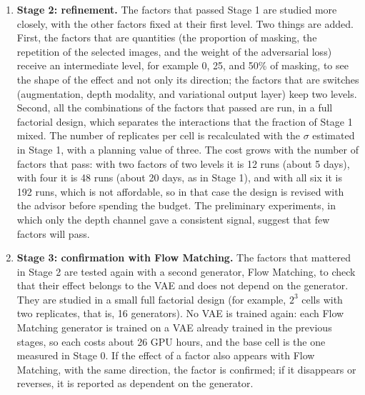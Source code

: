 \begin{enumerate}
  \item \textbf{Stage 2: refinement.} The factors that passed Stage 1 are studied more closely, with the other factors fixed at their first level. Two things are added. First, the factors that are quantities (the proportion of masking, the repetition of the selected images, and the weight of the adversarial loss) receive an intermediate level, for example 0, 25, and 50\% of masking, to see the shape of the effect and not only its direction; the factors that are switches (augmentation, depth modality, and variational output layer) keep two levels. Second, all the combinations of the factors that passed are run, in a full factorial design, which separates the interactions that the fraction of Stage 1 mixed. The number of replicates per cell is recalculated with the $\sigma$ estimated in Stage 1, with a planning value of three. The cost grows with the number of factors that pass: with two factors of two levels it is 12 runs (about 5 days), with four it is 48 runs (about 20 days, as in Stage 1), and with all six it is 192 runs, which is not affordable, so in that case the design is revised with the advisor before spending the budget. The preliminary experiments, in which only the depth channel gave a consistent signal, suggest that few factors will pass.
  \item \textbf{Stage 3: confirmation with Flow Matching.} The factors that mattered in Stage 2 are tested again with a second generator, Flow Matching, to check that their effect belongs to the VAE and does not depend on the generator. They are studied in a small full factorial design (for example, $2^3$ cells with two replicates, that is, 16 generators). No VAE is trained again: each Flow Matching generator is trained on a VAE already trained in the previous stages, so each costs about 26 GPU hours, and the base cell is the one measured in Stage 0. If the effect of a factor also appears with Flow Matching, with the same direction, the factor is confirmed; if it disappears or reverses, it is reported as dependent on the generator.
\end{enumerate}

